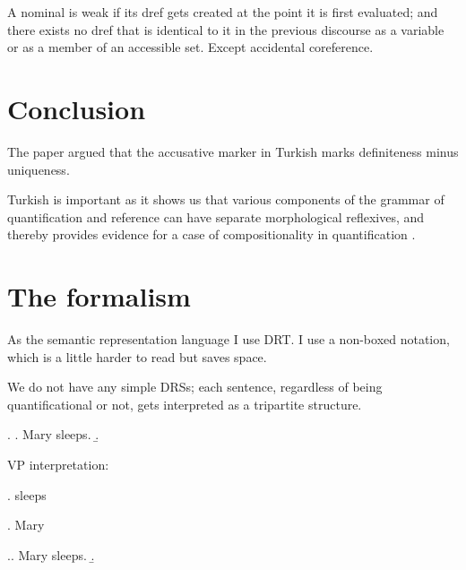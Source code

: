 \documentclass[11pt,a4paper]{article}
\begin{document}
\begin{comment}
* 51-2 inflection -- like plural in their case -- requires local accommodation, while lexical determiners are more flexible. 

* Plurarlity is an indicator of non-atomicity.

# Lopez 2012:

* syntactic structure limits the availability of modes of combination; its effect is not direct as in diesing92.


\end{comment}

\begin{udefinition}
A nominal is weak if its dref gets created at the point it is first evaluated; and there exists no dref that is identical to it in the previous discourse as a variable or as a member of an accessible set. Except accidental coreference.
\end{udefinition}


\section{Conclusion}

The paper argued that the accusative marker in Turkish marks definiteness minus
uniqueness.

Turkish is important as it shows us that various components of the grammar of quantification and reference can have separate morphological reflexives, and thereby provides evidence for a case of compositionality in quantification .

\appendix

\section{The formalism}

As the semantic representation language I use DRT. I use a non-boxed notation, which is a little harder to read but saves space.  

We do not have any simple DRSs; each sentence, regardless of being quantificational or not, gets interpreted as a tripartite structure. 


\ex. 
\a. Mary sleeps.
\b. 


VP interpretation:

\ex. sleeps 

\ex. Mary   

\ex.\a. Mary sleeps.
\b. \sysm{[x: x = m']\langle \forall \rangle [: sleeps'm']} 
\end{document}
